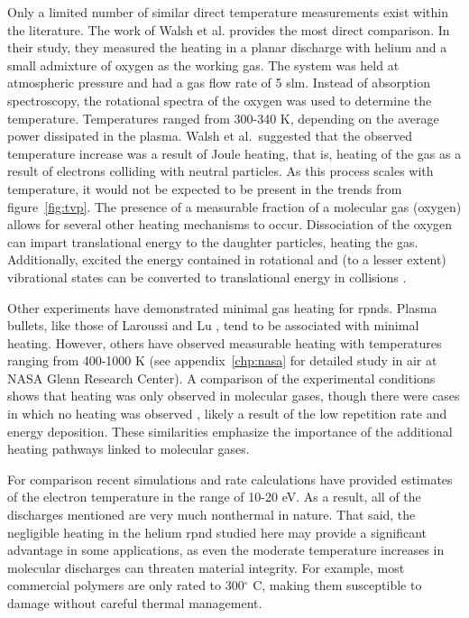 Only a limited number of similar direct temperature measurements exist within
the literature. The work of Walsh et al. \cite{Walsh2010} provides the most
direct comparison. In their study, they measured the heating in a planar
discharge with helium and a small admixture of oxygen as the working gas. The
system was held at atmospheric pressure and had a gas flow rate of 5 slm.
Instead of absorption spectroscopy, the rotational spectra of the oxygen was
used to determine the temperature. Temperatures ranged from 300-340 K, depending
on the average power dissipated in the plasma. Walsh et al.\ suggested that the
observed temperature increase was a result of Joule heating, that is, heating of
the gas as a result of electrons colliding with neutral particles. As this
process scales with temperature, it would not be expected to be present in the
trends from figure~\ref{fig:tvp}. The presence of a measurable fraction of a
molecular gas (oxygen) allows for several other heating mechanisms to occur.
Dissociation of the oxygen can impart translational energy to the daughter
particles, heating the gas. Additionally, excited the energy contained in
rotational and (to a lesser extent) vibrational states can be converted to
translational energy in collisions \cite{Kiehlbauch2003}.

Other experiments have demonstrated minimal gas heating for \acs{rpnd}s. Plasma
bullets, like those of Laroussi and Lu \cite{Laroussi2005, Lu2006}, tend to be
associated with minimal heating. However, others have observed measurable
heating with temperatures ranging from 400-1000 K \cite{Pai2009, Popov2011,
Zuzeek2010, Aleksandrov2010} (see appendix~\ref{chp:nasa} for detailed study in
air at NASA Glenn Research Center). A comparison of the experimental conditions
shows that heating was only observed in molecular gases, though there were cases
in which no heating was observed \cite{Pancheshnyi2000}, likely a result of the
low repetition rate and energy deposition. These similarities emphasize the
importance of the additional heating pathways linked to molecular gases.

For comparison recent simulations and rate calculations \cite{Takashima2011,
Aleksandrov2007} have provided estimates of the electron temperature in the
range of 10-20 eV. As a result, all of the discharges mentioned are very much
nonthermal in nature. That said, the negligible heating in the helium \acs{rpnd}
studied here may provide a significant advantage in some applications, as even
the moderate temperature increases in molecular discharges can threaten material
integrity. For example, most commercial polymers are only rated to 300$^\circ$
C, making them susceptible to damage without careful thermal management.

